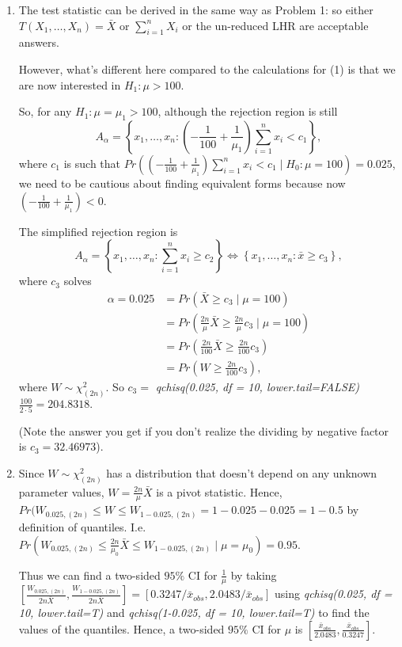 \documentclass[12pt]{article}
\begin{document}
\begin{enumerate}[leftmargin=\labelsep]
\item
The test statistic can be derived in the same way as Problem 1: so either 
$T(X_1, \dots, X_n) = \bar{X} \text{ or } \sum_{i=1}^{n}X_i$ or the un-reduced LHR are acceptable answers.


However, what's different here compared to the calculations for (1) is that we are now interested in $H_1: \mu > 100$.

So, for any $H_1: \mu = \mu_1 > 100$, although the rejection region is still $$A_{\alpha} = \left\{x_1, \dots, x_n :  \left(-\frac{1}{100} + \frac{1}{\mu_1} \right) \sum_{i=1}^{n}x_i < c_1 \right\},$$ where $c_1$ is such that $Pr\left(\left( -\frac{1}{100} + \frac{1}{\mu_1} \right) \sum_{i=1}^{n}x_i < c_1 \mid H_0: \mu=100 \right) = 0.025$, we need to be cautious about finding equivalent forms because now $\left(-\frac{1}{100} + \frac{1}{\mu_1} \right) < 0$. 

The simplified  rejection region is $$A_{\alpha} = \left\{x_1, \dots, x_n : \sum_{i=1}^{n}x_i \geq c_2 \right\} \Longleftrightarrow \left\{x_1, \dots, x_n : \bar{x} \geq c_3 \right\},$$
where $c_3$ solves 
\begin{align*}
\alpha =0.025 &= Pr\left(\bar{X} \geq c_3 \mid \mu = 100 \right) \\
&=  Pr\left(\frac{2n}{\mu}\bar{X} \geq \frac{2n}{\mu}c_3 \mid \mu = 100 \right) \\
&=  Pr\left(\frac{2n}{100}\bar{X} \geq \frac{2n}{100}c_3  \right) \\
&=  Pr\left(W \geq \frac{2n}{100}c_3  \right), 
\end{align*}
where $W \sim \chi^2_{(2n)}$. So $c_3 = $ \textit{qchisq(0.025, df = 10, lower.tail=FALSE)} $ \frac{100}{2\cdot 5}= 204.8318.$

(Note the answer you get if you don't realize the dividing by negative factor is $c_3=32.46973$).


\item Since $W \sim \chi^{2}_{(2n)}$ has a distribution that doesn't depend on any unknown parameter values, $W = \frac{2n}{\mu}\bar{X}$ is a pivot statistic. Hence, $Pr(W_{0.025, (2n)} \leq W \leq W_{1-0.025, (2n)} = 1 - 0.025 - 0.025 = 1-0.5$ by definition of quantiles. I.e. $Pr\left(W_{0.025, (2n)} \leq \frac{2n}{\mu_0}\bar{X} \leq W_{1-0.025, (2n)} \mid \mu = \mu_0 \right) = 0.95$. 

Thus we can find a two-sided $95\%$ CI for $\frac{1}{\mu}$ by taking 
$\left[ \frac{W_{0.025, (2n)}}{2n\bar{X}}, \frac{W_{1-0.025, (2n)}}{2n\bar{X}}  \right] = [0.3247/\bar{x}_{obs}, 2.0483/\bar{x}_{obs}]$ using \textit{qchisq(0.025, df = 10, lower.tail=T)} and \textit{qchisq(1-0.025, df = 10, lower.tail=T)} to find the values of the quantiles. Hence, a two-sided $95\%$ CI for $\mu$ is $\left[\frac{\bar{x}_{obs}}{2.0483} ,\frac{\bar{x}_{obs}}{0.3247} \right]$.



\end{enumerate}
\end{document}
